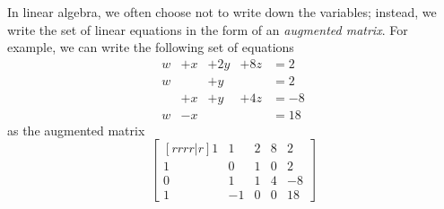 \documentclass[10pt, a4paper]{amsart}
\theoremstyle{definition}
\theoremstyle{remark}
\begin{document}
In linear algebra, we often choose not to write down the variables;
instead, we write the set of linear equations in the form of an
\emph{augmented matrix}. For example, we can write the following
set of equations
\begin{displaymath}\begin{array}{rllll}
  w & + x & + 2y & + 8z & = 2\\
  w &     & + y  &      & = 2\\
    & + x & + y  & + 4z & = -8\\
  w & - x &      &      & = 18
\end{array}\end{displaymath}
as the augmented matrix
\begin{displaymath}
  \begin{bmatrix}[rrrr|r]
    1 &  1 & 2 & 8 & 2\\
    1 &  0 & 1 & 0 & 2\\
    0 &  1 & 1 & 4 & -8\\
    1 & -1 & 0 & 0 & 18
  \end{bmatrix}
\end{displaymath}
\end{document}
